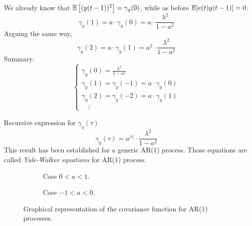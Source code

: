 We already know that $\mathbb{E}\left[(y(t-1))^{2}\right]=\gamma_{y}(0)$, while as before $\mathbb{E}[e(t) y(t-1)]=0$.
$$
\gamma_{y}(1)=a \cdot \gamma_{y}(0)=a \cdot \frac{\lambda^{2}}{1-a^{2}}
$$
Arguing the same way,
\[
	\gamma_{y}(2)=a \cdot \gamma_{y}(1)=a^{2} \cdot \frac{\lambda^{2}}{1-a^{2}}
\]
Summary:
\begin{equation*}
	\boxed{
		\begin{cases}
			\gamma_{y}(0)=\frac{\lambda^{2}}{1-a^{2}} \\
			\gamma_{y}(1)=\gamma_{y}(-1)=a \cdot \gamma_{y}(0) \\
			\gamma_{y}(2)=\gamma_{y}(-2)=a \cdot \gamma_{y}(1) \\
			\quad\vdots
		\end{cases}
	}
\end{equation*}

Recursive expression for $\gamma_{y}(\tau)$
$$
	\gamma_{y}(\tau)=a^{|\tau|}\cdot \frac{\lambda^{2}}{1-a^{2}}
$$
This result has been established for a generic AR($1$) process.
Those equations are called \emph{Yule-Walker equations} for AR($1$) process.

\begin{figure}[htpb]
	\centering
	\begin{subfigure}{.5\textwidth}
		\centering
		\caption{Case $0<a<1$.}
	\end{subfigure}%
	\begin{subfigure}{.5\textwidth}
		\centering
		\caption{Case $-1<a<0$.}
	\end{subfigure}
	\caption{Graphical representation of the covariance function for AR($1$) processes.}
\end{figure}
\FloatBarrier

